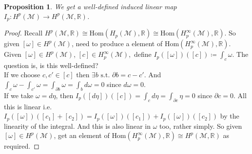 \documentclass[10pt]{article}
\theoremstyle{plain}
\newtheorem{prop}[thm]{Proposition}
\theoremstyle{definition}
\newcommand{\st}{\text{ s.t. }}
\newcommand{\Real}{\mathbb{R}}
\newcommand{\man}{\mathcal{M}}
\newcommand{\Hom}[2]{\text{Hom}\left(#1,#2\right)}
\newcommand{\deriv}{d}
\newcommand{\dw}{d\omega}
\newcommand{\deta}{\deriv\eta}
\begin{document}
\begin{prop}
    We get a well-defined induced linear map $I_p : H^p(\man) \to H^p(\man,\Real)$.
\end{prop}
\begin{proof}
    Recall $H^p(\man,\Real) \cong \Hom{H_p(\man)}{\Real} \cong \Hom{H_p^\infty(\man)}{\Real}$. So given $[\omega] \in H^p(\man)$, need to produce a element of $\Hom{H_p^\infty(\man)}{\Real}$. Given $[\omega] \in H^p(\man)$, $[c] \in H_p^\infty(\man),$ define $I_p([\omega])([c]) \coloneqq \int_c \omega$. The question is, is this well-defined?\\
    If we choose $c, c'\in [c]$ then $\exists b \st \partial b = c - c'$. And $\int_c \omega - \int_{c'} \omega = \int_{\partial b} \omega = \int_b \dw = 0$ since $\dw = 0$.\\
    If we take $\omega = \deta$, then $I_p([\deta])([c]) = \int_c \deta = \int_{\partial c} \eta = 0$ since $\partial c = 0$. All this is linear i.e. $I_p([\omega])([c_1]+[c_2]) = I_p([\omega])([c_1])+I_p([\omega])([c_2])$ by the linearity of the integral. And this is also linear in $\omega$ too, rather simply. So given $[\omega] \in H^p(\man)$, get an element of $\Hom{H_p^\infty(\man)}{\Real} \cong H^p(\man,\Real)$ as required.
\end{proof}
\end{document}

